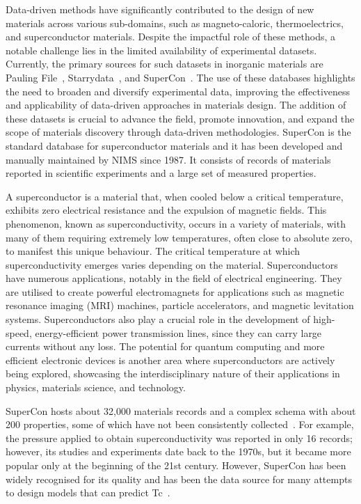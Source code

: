 Data-driven methods have significantly contributed to the design of new materials across various sub-domains, such as magneto-caloric, thermoelectrics, and superconductor materials. Despite the impactful role of these methods, a notable challenge lies in the limited availability of experimental datasets. 
Currently, the primary sources for such datasets in inorganic materials are Pauling File~\cite{Blokhin2018ThePF_paulingFile}, Starrydata~\cite{katsura2019data}, and SuperCon~\cite{ishii2023structuring}. 
The use of these databases highlights the need to broaden and diversify experimental data, improving the effectiveness and applicability of data-driven approaches in materials design. The addition of these datasets is crucial to advance the field, promote innovation, and expand the scope of materials discovery through data-driven methodologies.
SuperCon is the standard database for superconductor materials and it has been developed and manually maintained by NIMS since 1987. 
It consists of records of materials reported in scientific experiments and a large set of measured properties. 

A superconductor is a material that, when cooled below a critical temperature, exhibits zero electrical resistance and the expulsion of magnetic fields. This phenomenon, known as superconductivity, occurs in a variety of materials, with many of them requiring extremely low temperatures, often close to absolute zero, to manifest this unique behaviour. The critical temperature at which superconductivity emerges varies depending on the material. Superconductors have numerous applications, notably in the field of electrical engineering. They are utilised to create powerful electromagnets for applications such as magnetic resonance imaging (MRI) machines, particle accelerators, and magnetic levitation systems. Superconductors also play a crucial role in the development of high-speed, energy-efficient power transmission lines, since they can carry large currents without any loss. The potential for quantum computing and more efficient electronic devices is another area where superconductors are actively being explored, showcasing the interdisciplinary nature of their applications in physics, materials science, and technology.

SuperCon hosts about 32,000 materials records and a complex schema with about 200 properties, some of which have not been consistently collected~\cite{sommer20223dsc}. 
For example, the pressure applied to obtain superconductivity was reported in only 16 records; however, its studies and experiments date back to the 1970s, but it became more popular only at the beginning of the 21st century.  
However, SuperCon has been widely recognised for its quality and has been the data source for many attempts to design models that can predict Tc~\cite{stanev2017machine, le2020critical, Hamlin2019SuperconductivityNR}. 

